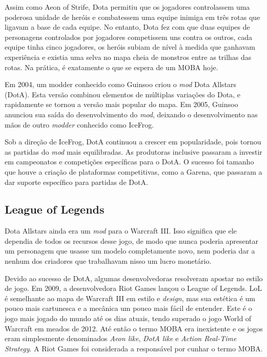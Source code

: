 Assim como Aeon of Strife, Dota permitiu que os jogadores controlassem uma poderosa unidade de heróis e combatessem uma equipe inimiga em três rotas que ligavam a base de cada equipe. No entanto, Dota fez com que duas equipes de personagens controlados por jogadores competissem uns contra os outros, cada equipe tinha cinco jogadores, os heróis subiam de nível à medida que ganhavam experiência e existia uma selva no mapa cheia de monstros entre as trilhas das rotas. Na prática, é exatamente o que se espera de um MOBA hoje.

Em 2004, um modder conhecido como Guinsoo criou o \textit{mod} Dota Allstars (DotA). Esta versão combinou elementos de múltiplas variações do Dota, e rapidamente se tornou a versão mais popular do mapa. Em 2005, Guinsoo anunciou sua saída do desenvolvimento do \textit{mod}, deixando o desenvolvimento nas mãos de outro \textit{modder} conhecido como IceFrog.

Sob a direção de IceFrog, DotA continuou a crescer em popularidade, pois tornou as partidas do \textit{mod} mais equilibradas. As produtoras inclusive passaram a investir em campeonatos e competições específicas para o DotA. O sucesso foi tamanho que houve a criação de plataformas competitivas, como a Garena, que passaram a dar suporte específico para partidas de DotA.

\subsection{League of Legends}
Dota Allstars ainda era um \textit{mod} para o Warcraft III. Isso significa que ele dependia de todos os recursos desse jogo, de modo que nunca poderia apresentar um personagem que usasse um modelo completamente novo, nem poderia dar a nenhum dos criadores que trabalhavam nisso um lucro monetário.

Devido ao sucesso de DotA, algumas desenvolvedoras resolveram apostar no estilo de jogo. Em 2009, a desenvolvedora Riot Games lançou o League of Legends. LoL é semelhante ao mapa de Warcraft III em estilo e \textit{design}, mas sua estética é um pouco mais cartunesca e a mecânica um pouco mais fácil de entender. Este é o jogo mais jogado do mundo até os dias atuais, tendo superado o jogo World of Warcraft em meados de 2012. Até então o termo MOBA era inexistente e os jogos eram simplesmente denominados \textit{Aeon like}, \textit{DotA like} e \textit{Action Real-Time Strategy}. A Riot Games foi considerada a responsável por cunhar o termo MOBA.

